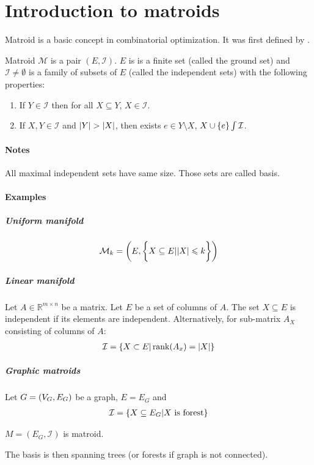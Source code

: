 \section{Introduction to matroids}
Matroid is a basic concept in combinatorial optimization. It was first defined by \citet{whitney1935abstract}. 
\begin{definition}[matroid]
	Matroid $\mathcal{M}$ is a pair $(E,\mathcal{I})$. $E$ is is a finite set (called the ground set) and $\mathcal{I}\neq \emptyset$ is a family of subsets of $E$ (called the independent sets) with the following properties:
	\begin{enumerate}
		\item If $Y\in \mathcal{I}$ then for all $X\subseteq Y$, $X\in \mathcal{I}$.
		\item If $X,Y\in \mathcal{I}$ and $\abs{Y}>\abs{X}$, then exists $e\in Y\setminus X$, $X\cup \qty{e} \int \mathcal{I}$.
	\end{enumerate}
\end{definition}

\paragraph{Notes} All maximal independent sets have same size. Those sets are called basis.


\paragraph{Examples}
\subparagraph{Uniform manifold} 
\begin{align}
	\mathcal{M}_{k} = \qty(E, \qty\bigg{X\subseteq E | \abs{X} \leqslant k})
\end{align}
\subparagraph{Linear manifold} 
Let $A\in \mathbb{R}^{m\times n}$ be a matrix. Let $E$ be a set of columns of $A$. The set $X\subseteq E$ is independent if its elements are independent. Alternatively, for sub-matrix $A_X$ consisting of columns of $A$:
\begin{align}
\mathcal{I} = \qty{ X\subset E | \rank(A_x) = \abs{X}}
\end{align}


\subparagraph{Graphic matroids} 
Let $G=\qty(V_G,E_G)$ be a graph, $E=E_G$ and
\begin{align}
\mathcal{I} = \qty{X\subseteq E_G | X \text{ is forest}}
\end{align}
\begin{prop}
	$M=(E_G,\mathcal{I})$ is matroid.
\end{prop}
The basis is then spanning trees (or forests if graph is not connected).

